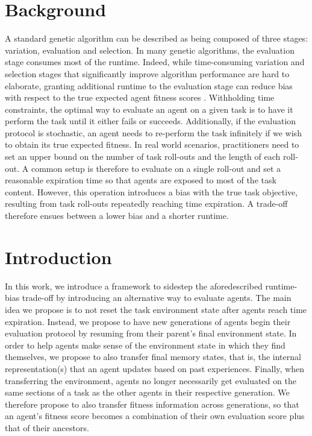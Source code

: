 \documentclass[dvipsnames,format=sigconf,anonymous=false,review=false]{acmart}
\begin{document}
\maketitle

\section{Background}
A standard genetic algorithm can be described as being composed of three stages: variation, evaluation and selection. In many genetic algorithms, the evaluation stage consumes most of the runtime. Indeed, while time-consuming variation and selection stages that significantly improve algorithm performance are hard to elaborate, granting additional runtime to the evaluation stage can reduce bias with respect to the true expected agent fitness scores \cite{lambora2019genetic, stanley2019designing}. Withholding time constraints, the optimal way to evaluate an agent on a given task is to have it perform the task until it either fails or succeeds. Additionally, if the evaluation protocol is stochastic, an agent needs to re-perform the task infinitely if we wish to obtain its true expected fitness. In real world scenarios, practitioners need to set an upper bound on the number of task roll-outs and the length of each roll-out. A common setup is therefore to evaluate on a single roll-out and set a reasonable expiration time \cite{salimans2017evolution, such2017deep} so that agents are exposed to most of the task content. However, this operation introduces a bias with the true task objective, resulting from task roll-outs repeatedly reaching time expiration. A trade-off therefore ensues between a lower bias and a shorter runtime.

\section{Introduction}

In this work, we introduce a framework to sidestep the aforedescribed runtime-bias trade-off by introducing an alternative way to evaluate agents. The main idea we propose is to not reset the task environment state after agents reach time expiration. Instead, we propose to have new generations of agents begin their evaluation protocol by resuming from their parent's final environment state. In order to help agents make sense of the environment state in which they find themselves, we propose to also transfer final memory states, that is, the internal representation(s) that an agent updates based on past experiences. Finally, when transferring the environment, agents no longer necessarily get evaluated on the same sections of a task as the other agents in their respective generation. We therefore propose to also transfer fitness information across generations, so that an agent’s fitness score becomes a combination of their own evaluation score plus that of their ancestors.
\end{document}
